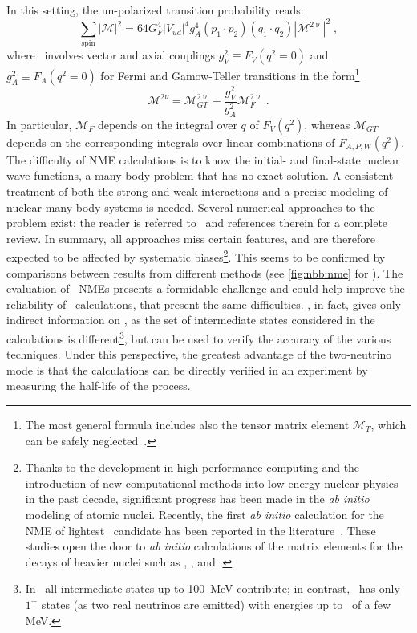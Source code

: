 In this setting, the un-polarized transition probability reads:
\begin{equation}\label{eq:nbb:trans-prob}
  \sum_\text{spin} |\mathcal{M}|^2 = 64 G^4_F |V_{ud}|^4 g^4_A (p_1 \cdot p_2)
                                     (q_1 \cdot q_2) |\mathcal{M}^{2\upnu}|^2 \;,
\end{equation}
where \nmet\ involves vector and axial couplings $g^2_V \equiv F_V(q^2=0)$ and $g^2_A
\equiv F_A(q^2=0)$ for Fermi and Gamow-Teller transitions in the form\footnote{%
  The most general formula includes also the tensor matrix element $\mathcal{M}_T$, which
  can be safely neglected~\cite{Engel2017}.
}
\[
  \mathcal{M}^{2\nu} = \mathcal{M}^{2\upnu}_{GT} -
                       \frac{g^2_V}{g^2_A} \mathcal{M}^{2\upnu}_F \;.
\]
In particular, $\mathcal{M}_F$ depends on the integral over $q$ of $F_V(q^2)$, whereas
$\mathcal{M}_{GT}$ depends on the corresponding integrals over linear combinations of
$F_{A,P,W}(q^2)$.
\newpar
The difficulty of NME calculations is to know the initial- and final-state nuclear wave
functions, a many-body problem that has no exact solution. A consistent treatment of both the
strong and weak interactions and a precise modeling of nuclear many-body systems is
needed.
Several numerical approaches to
the problem exist; the reader is referred to~\cite{Engel2017} and references therein for a
complete review. In summary, all approaches miss certain features, and are therefore
expected to be affected by systematic biases\footnote{%
  Thanks to the development in high-performance computing and the introduction of new
  computational methods into low-energy nuclear physics in the past decade, significant
  progress has been made in the \emph{ab initio} modeling of atomic nuclei. Recently, the
  first \emph{ab initio} calculation for the NME of lightest \onbb\ candidate 
  has been reported in the literature~\cite{Yao2019}. These studies open the door to
  \emph{ab initio} calculations of the matrix elements for the decays of heavier nuclei
  such as \gesix, , and .
}. This seems to be confirmed by comparisons between results from different methods (see
\cref{fig:nbb:nme} for \onbb). The evaluation of \nnbb\ NMEs presents a formidable
challenge and could help improve the reliability of \nmez\ calculations, that present the
same difficulties. \nnbb, in fact, gives only indirect information on \onbb, as the set of
intermediate states considered in the calculations is different\footnote{%
  In \onbb\ all intermediate states up to 100~MeV contribute; in contrast, \nnbb\ has only
  $1^+$ states (as two real neutrinos are emitted) with energies up to \qbb\ of a few MeV.
}, but can be used to verify the accuracy of the various techniques.  Under this
perspective, the greatest advantage of the two-neutrino mode is that the calculations can
be directly verified in an experiment by measuring the half-life of the process.

